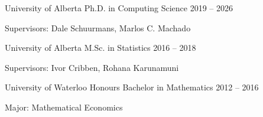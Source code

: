 \vspace{-3mm}
\begin{cventries}
  \cventry
    {University of Alberta}
    {Ph.D. in Computing Science}
    {2019 -- 2026}
    {
      \vspace{-4.0mm}
      \begin{cvitems}
        \item[>>] {Supervisors: Dale Schuurmans, Marlos C. Machado}
      \end{cvitems}
    }

  \cventry
    {University of Alberta}
    {M.Sc. in Statistics}
    {2016 -- 2018}
    {
      \vspace{-4.0mm}
      \begin{cvitems}
        \item[>>] {Supervisors: Ivor Cribben, Rohana Karunamuni}
      \end{cvitems}
    }

  \cventry
    {University of Waterloo}
    {Honours Bachelor in Mathematics}
    {2012 -- 2016}
    {
      \vspace{-4.0mm}
      \begin{cvitems}
        \item[>>] Major: Mathematical Economics
      \end{cvitems}
    }
\end{cventries}

